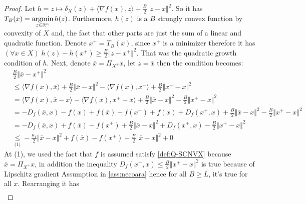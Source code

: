 \documentclass[12pt]{article}
\begin{document}
        \begin{proof}
            Let $h = z \mapsto \delta_X(z) + \langle \nabla f(x), z\rangle + \frac{B}{2}\Vert z - x\Vert^2$.
            So it has $T_B(x) = \mathop{\rm argmin}\limits_{z\in \mathbb R^n} h(z)$. 
            Furthermore, $h(z)$ is a $B$ strongly convex function by convexity of $X$ and, the fact that other parts are just the sum of a linear and quadratic function. 
            Denote $x^+ = T_B(x)$, since $x^+$ is a minimizer therefore it has $(\forall x \in X)\; h(z) - h(x^+) \ge \frac{B}{2}\Vert z - x^+\Vert^2$. 
            That was the quadratic growth condition of $h$. 
            Next, denote $\bar x  = \Pi_{X^+}x$, let $z = \bar x$ then the condition becomes: 
            \begin{align*}
                & \frac{B}{2}\Vert \bar x - x^+\Vert^2 
                \\
                &\le 
                \langle \nabla f(x), \bar x\rangle + \frac{B}{2}\Vert \bar x - x\Vert^2 - 
                \langle \nabla f(x), x^+\rangle + \frac{B}{2}\Vert x^+ - x\Vert^2
                \\
                &=
                \langle \nabla f(x), \bar x - x\rangle - \langle \nabla f(x), x^+ - x\rangle
                + \frac{B}{2}\Vert \bar x - x\Vert^2 
                - \frac{B}{2}\Vert x^+ - x\Vert^2
                \\
                &= - D_f(\bar x, x) - f(x) + f(\bar x) - f(x^+) + f(x) + D_f(x^+, x)
                + \frac{B}{2}\Vert \bar x - x\Vert^2 
                - \frac{B}{2}\Vert x^+ - x\Vert^2
                \\
                &= 
                - D_f(\bar x, x) + f(\bar x) - f(x^+) 
                + \frac{B}{2}\Vert \bar x - x\Vert^2 
                + D_f(x^+, x)
                - \frac{B}{2}\Vert x^+ - x\Vert^2
                \\
                &\underset{\text{(1)}}{\le} 
                - \frac{\kappa_f}{2}\Vert \bar x - x\Vert^2
                + f(\bar x) - f(x^+)
                + \frac{B}{2}\Vert \bar x - x\Vert^2 
                + 0
            \end{align*}
            At (1), we used the fact that $f$ is assumed satisfy \ref{def:Q-SCNVX} because $\bar x = \Pi_{X^+}x$, in addition the inequality $D_f(x^+, x) \le \frac{B}{2}\Vert x^+ - x\Vert^2$ is true because of Lipschitz gradient Assumption in \ref{ass:necoara} hence for all $B\ge L$, it's true for all $x$. 
            Rearranging it has 
            \begin{align*}

\end{align*}
\end{proof}
\end{document}

